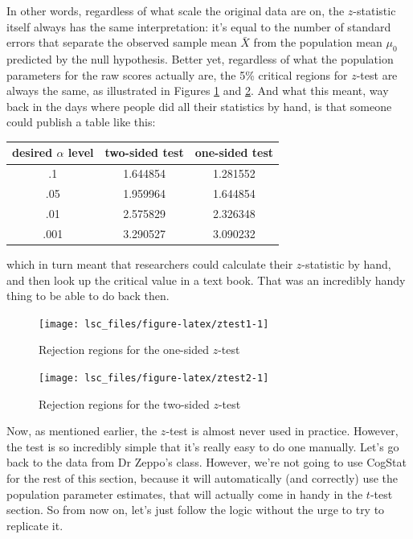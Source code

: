 \documentclass[
  11pt,
  a4paper,
  twoside,symmetric,openright]{book}
\theoremstyle{break}
\theoremstyle{break}
\begin{document}
In other words, regardless of what scale the original data are on, the \(z\)-statistic itself always has the same interpretation: it's equal to the number of standard errors that separate the observed sample mean \(\bar{X}\) from the population mean \(\mu_0\) predicted by the null hypothesis. Better yet, regardless of what the population parameters for the raw scores actually are, the 5\% critical regions for \(z\)-test are always the same, as illustrated in Figures \ref{fig:ztest1} and \ref{fig:ztest2}. And what this meant, way back in the days where people did all their statistics by hand, is that someone could publish a table like this:

\begin{longtable}[]{@{}ccc@{}}
\toprule\noalign{}
desired \(\alpha\) level & two-sided test & one-sided test \\
\midrule\noalign{}
\endhead
\bottomrule\noalign{}
\endlastfoot
.1 & 1.644854 & 1.281552 \\
.05 & 1.959964 & 1.644854 \\
.01 & 2.575829 & 2.326348 \\
.001 & 3.290527 & 3.090232 \\
\end{longtable}

which in turn meant that researchers could calculate their \(z\)-statistic by hand, and then look up the critical value in a text book. That was an incredibly handy thing to be able to do back then.

\begin{figure}

{\centering \texttt{[image: lsc\_files/figure-latex/ztest1-1]} 

}

\caption{Rejection regions for the one-sided $z$-test}\label{fig:ztest1}
\end{figure}

\begin{figure}

{\centering \texttt{[image: lsc\_files/figure-latex/ztest2-1]} 

}

\caption{Rejection regions for the two-sided $z$-test}\label{fig:ztest2}
\end{figure}

Now, as mentioned earlier, the \(z\)-test is almost never used in practice. However, the test is so incredibly simple that it's really easy to do one manually. Let's go back to the data from Dr Zeppo's class. However, we're not going to use CogStat for the rest of this section, because it will automatically (and correctly) use the population parameter estimates, that will actually come in handy in the \(t\)-test section. So from now on, let's just follow the logic without the urge to try to replicate it.
\end{document}
